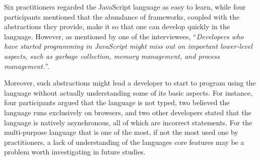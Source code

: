 Six practitioners regarded the JavaScript language as easy to learn, while four
participants mentioned that the abundance of frameworks,
coupled with the abstractions they provide, make it so that one
can develop quickly in the language. However, as mentioned by one
of the interviewees, ``\emph{Developers who have started
programming in JavaScript might miss out on important lower-level
aspects, such as garbage collection, memory management,
and process management.}''. 

Moreover, such abstractions might lead a developer to start to program
using the language without actually understanding some of its basic aspects.
For instance, four participants argued that the language is not typed, two  believed the language runs exclusively on browsers, and two other developers stated that the language is natively asynchronous, all of which are incorrect statements. For the multi-purpose language that is one of the most, if not the most used one by practitioners,
a lack of understanding of the languages core
features may be a problem worth investigating in future studies.





